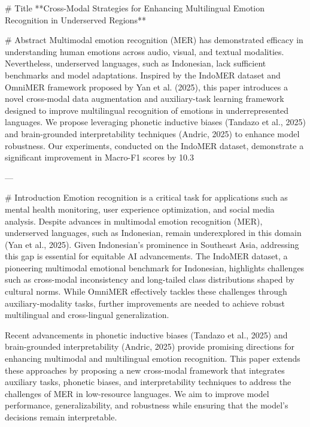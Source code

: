 # Title  
**Cross-Modal Strategies for Enhancing Multilingual Emotion Recognition in Underserved Regions**

# Abstract  
Multimodal emotion recognition (MER) has demonstrated efficacy in understanding human emotions across audio, visual, and textual modalities. Nevertheless, underserved languages, such as Indonesian, lack sufficient benchmarks and model adaptations. Inspired by the IndoMER dataset and OmniMER framework proposed by Yan et al. (2025), this paper introduces a novel cross-modal data augmentation and auxiliary-task learning framework designed to improve multilingual recognition of emotions in underrepresented languages. We propose leveraging phonetic inductive biases (Tandazo et al., 2025) and brain-grounded interpretability techniques (Andric, 2025) to enhance model robustness. Our experiments, conducted on the IndoMER dataset, demonstrate a significant improvement in Macro-F1 scores by 10.3%

---

# Introduction  
Emotion recognition is a critical task for applications such as mental health monitoring, user experience optimization, and social media analysis. Despite advances in multimodal emotion recognition (MER), underserved languages, such as Indonesian, remain underexplored in this domain (Yan et al., 2025). Given Indonesian's prominence in Southeast Asia, addressing this gap is essential for equitable AI advancements. The IndoMER dataset, a pioneering multimodal emotional benchmark for Indonesian, highlights challenges such as cross-modal inconsistency and long-tailed class distributions shaped by cultural norms. While OmniMER effectively tackles these challenges through auxiliary-modality tasks, further improvements are needed to achieve robust multilingual and cross-lingual generalization.

Recent advancements in phonetic inductive biases (Tandazo et al., 2025) and brain-grounded interpretability (Andric, 2025) provide promising directions for enhancing multimodal and multilingual emotion recognition. This paper extends these approaches by proposing a new cross-modal framework that integrates auxiliary tasks, phonetic biases, and interpretability techniques to address the challenges of MER in low-resource languages. We aim to improve model performance, generalizability, and robustness while ensuring that the model's decisions remain interpretable.

